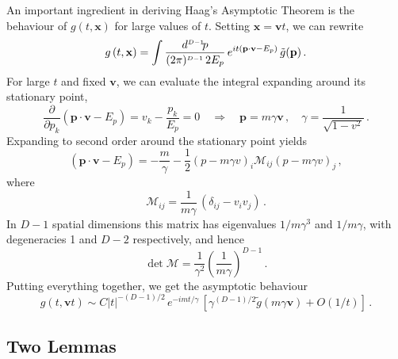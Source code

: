 An important ingredient in deriving Haag's Asymptotic Theorem is the 
behaviour of $g(t,\mathbf{x})$ for large values of $t$. Setting 
$\mathbf{x}=\mathbf{v} t$, we can rewrite
\begin{equation}
    \label{eq:LargeTExp}
    g\left(t,\mathbf{x}\right) = 
        \int \frac{d^{\scriptscriptstyle{D-1}}\!p}{(2\pi)^{\scriptscriptstyle{D-1}}\, 2E_p}\,
        e^{it \left(\mathbf{p}\cdot \mathbf{v} - E_p\right)}\, 
        \tilde{g}(\mathbf{p})\, .
\end{equation}
For large $t$ and fixed $\mathbf{v}$, we can evaluate the integral expanding around 
its stationary point,
\begin{equation}
    \label{eq:StationaryPoint}
    \frac{\partial}{\partial p_k} \left(\mathbf{p}\cdot \mathbf{v} - E_p\right) = 
    v_k - \frac{p_k}{E_p}=0 \quad \Longrightarrow \quad 
    \mathbf{p} = m \gamma \mathbf{v}\, , \quad 
    \gamma = \frac{1}{\sqrt{1-v^2}}\, .
\end{equation}
Expanding to second order around the stationary point yields
\begin{equation}
    \label{eq:StatPtExpand}
    \left(\mathbf{p}\cdot \mathbf{v} - E_p\right) = 
    -\frac{m}{\gamma} - \frac12 \left(p-m\gamma v\right)_i
    \mathcal{M}_{ij} \left(p-m\gamma v\right)_j\, ,
\end{equation}
where 
\begin{equation}
    \label{eq:MMatrixAbove}
    \mathcal{M}_{ij} = \frac{1}{m\gamma} \, 
    \left(\delta_{ij} - v_i v_j\right)\, .
\end{equation}
In $D-1$ spatial dimensions this matrix has eigenvalues $1/m\gamma^3$ and $1/m\gamma$, 
with degeneracies 1 and $D-2$ respectively, and hence
\begin{equation}
    \label{eq:DetMMatrixAbove}
    \det \mathcal{M} = \frac{1}{\gamma^2} \left(\frac{1}{m\gamma}\right)^{D-1}\, .
\end{equation}
Putting everything together, we get the asymptotic behaviour
\begin{equation}
    \label{eq:GFunAsymp}
    g\left(t,\mathbf{v}t\right) \sim
        C \left|t\right|^{-(D-1)/2}\, e^{-imt/\gamma}\, 
        \left[\gamma^{(D-1)/2} \tilde{g}\left(m\gamma \mathbf{v}\right) +
        O\left(1/t\right)\right]\, .
\end{equation}


\subsection{Two Lemmas}
\label{sec:TwoLemmas}


